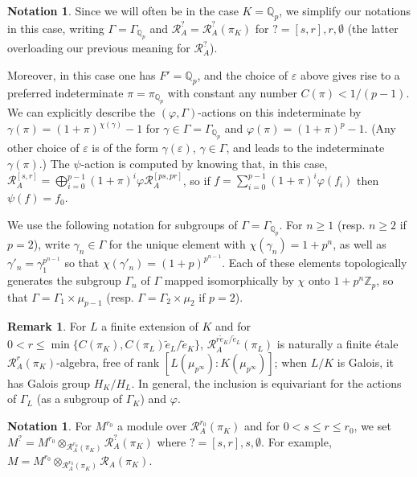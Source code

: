 \documentclass[12pt]{article}
\theoremstyle{definition}
\newtheorem{remark}[theorem]{Remark}
\newtheorem{notation}[theorem]{Notation}
\numberwithin{equation}{theorem}
\newcommand{\calR}{\mathcal{R}}
\newcommand{\QQ}{\mathbb{Q}}
\newcommand{\ZZ}{\mathbb{Z}}
\def\Qp{\QQ_p}
\begin{document}
\begin{notation}\label{N:simplify Qp}
Since we will often be in the case $K = \Qp$, we simplify our
notations in this case, writing $\Gamma = \Gamma_{\Qp}$ and $\calR_A^?
= \calR_A^?(\pi_K)$ for $?=[s,r],r,\emptyset$ (the latter overloading
our previous meaning for $\calR_A^?$).

Moreover, in this case one has $F'=\Qp$, and the choice of
$\varepsilon$ above gives rise to a preferred indeterminate $\pi =
\pi_{\Qp}$ with constant any number $C(\pi) < 1/(p-1)$.  We can
explicitly describe the $(\varphi, \Gamma)$-actions on this
indeterminate by $\gamma(\pi) = (1+\pi)^{\chi(\gamma)}-1$ for $\gamma
\in \Gamma = \Gamma_{\Qp}$ and $\varphi(\pi) = (1+\pi)^p-1$.  (Any
other choice of $\varepsilon$ is of the form $\gamma(\varepsilon)$,
$\gamma \in \Gamma$, and leads to the indeterminate $\gamma(\pi)$.)
The $\psi$-action is computed by knowing that, in this case,
$\calR^{[s,r]}_A = \bigoplus_{i=0}^{p-1}
(1+\pi)^i\varphi\calR^{[ps,pr]}_A$, so if $f = \sum_{i=0}^{p-1}
(1+\pi)^i \varphi(f_i)$ then $\psi(f) = f_0$.

We use the following notation for subgroups of $\Gamma =
\Gamma_{\Qp}$.  For $n \geq 1$ (resp. $n \geq 2$ if $p=2$), write
$\gamma_n \in \Gamma$ for the unique element with $\chi(\gamma_n) =
1+p^n$, as well as $\gamma'_n = \gamma_1^{p^{n-1}}$ so that
$\chi(\gamma'_n) = (1+p)^{p^{n-1}}$.  Each of these elements
topologically generates the subgroup $\Gamma_n$ of $\Gamma$ mapped
isomorphically by $\chi$ onto $1+p^n\ZZ_p$, so that $\Gamma = \Gamma_1
\times \mu_{p-1}$ (resp. $\Gamma = \Gamma_2 \times \mu_2$ if $p=2$).
\end{notation}

\begin{remark}
\label{R:Robba-ring-base-change}  
For $L$ a finite extension of $K$ and for $0< r \leq
\min\{C(\pi_K),C(\pi_L)\tilde e_L/\tilde e_K\}$, 
$\calR^{r\tilde e_K/\tilde e_L}_A(\pi_L)$ is naturally a finite \'etale
$\calR^r_A(\pi_K)$-algebra, free of rank
$[L(\mu_{p^\infty}):K(\mu_{p^\infty})]$; when $L/K$ is
Galois, it has Galois group
$H_K/H_L$.  In general, the inclusion is equivariant for the
actions of $\Gamma_L$ (as a subgroup of $\Gamma_K$) and $\varphi$.
\end{remark}

\begin{notation}
For $M^{r_0}$ a module over $\calR_A^{r_0}(\pi_K)$ and for $0< s \leq
r \leq r_0$, we set $M^? = M^{r_0} \otimes_{\calR_A^{r_0}(\pi_K)}
\calR_A^?(\pi_K)$ where $? = [s,r],s,\emptyset$.  For example, $M =
M^{r_0} \otimes_{\calR_A^{r_0}(\pi_K)} \calR_A(\pi_K)$.
\end{notation}
\end{document}
